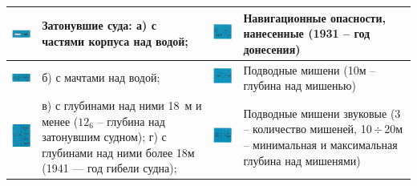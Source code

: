 \documentclass[a4paper, 12pt, twoside, final, book, russian, fittopage, cyremdash]{ncc}
\newcommand{\otdo}{\,\ensuremath{\div}\,}
\begin{document}
\small
\begin{longtable}{M|m{0.2\textwidth}|M|m{0.2\textwidth}}
  \toprule
  \includegraphics[scale=1.3]{APP-2-A-18} & Затонувшие суда: \newline а) с частями корпуса над водой; &
  \includegraphics[scale=1.3]{APP-2-A-26} & Навигационные опасности, нанесенные (1931 \--- год донесения) \\
  \midrule
  \includegraphics[scale=1.3]{APP-2-A-19} & б) с мачтами над водой; &
  \includegraphics[scale=1.3]{APP-2-A-27} & Подводные мишени (10м \--- глубина над мишенью) \\
  \midrule
  \includegraphics[scale=1.3]{APP-2-A-20} & в) с глубинами над ними 18~м и менее ($12_6$ \--- глубина над затонувшим судном); \newline г) с глубинами над ними более 18м (1941 --- год гибели судна); &
  \includegraphics[scale=1.3]{APP-2-A-28} & Подводные мишени звуковые (3 \--- количество мишеней, 10\otdo 20м \--- минимальная и максимальная глубина над мишенями) \\

\end{longtable}
\end{document}
